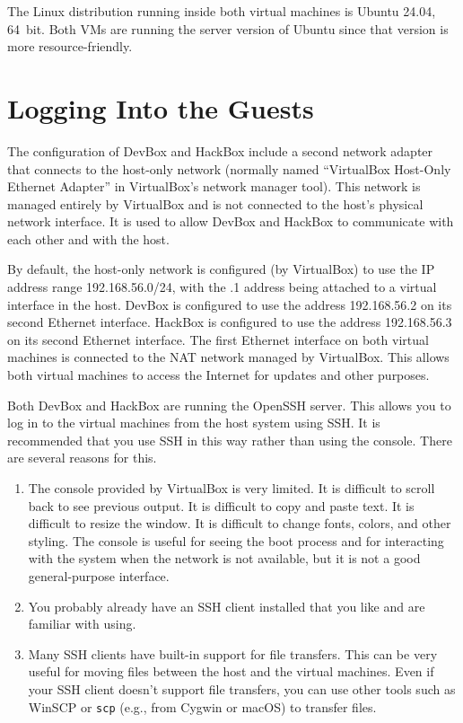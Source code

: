 \documentclass{article}
\begin{document}
The Linux distribution running inside both virtual machines is Ubuntu 24.04, 64~bit. Both VMs
are running the server version of Ubuntu since that version is more resource-friendly.

\section{Logging Into the Guests}
\label{sec:logging-in}

The configuration of DevBox and HackBox include a second network adapter that connects to the
host-only network (normally named ``VirtualBox Host-Only Ethernet Adapter'' in VirtualBox's
network manager tool). This network is managed entirely by VirtualBox and is not connected to
the host's physical network interface. It is used to allow DevBox and HackBox to communicate
with each other and with the host.

By default, the host-only network is configured (by VirtualBox) to use the IP address range
192.168.56.0/24, with the .1 address being attached to a virtual interface in the host. DevBox
is configured to use the address 192.168.56.2 on its second Ethernet interface. HackBox is
configured to use the address 192.168.56.3 on its second Ethernet interface. The first Ethernet
interface on both virtual machines is connected to the NAT network managed by VirtualBox. This
allows both virtual machines to access the Internet for updates and other purposes.

Both DevBox and HackBox are running the OpenSSH server. This allows you to log in to the virtual
machines from the host system using SSH. It is recommended that you use SSH in this way rather
than using the console. There are several reasons for this.

\begin{enumerate}
  \item The console provided by VirtualBox is very limited. It is difficult to scroll back to
    see previous output. It is difficult to copy and paste text. It is difficult to resize the
    window. It is difficult to change fonts, colors, and other styling. The console is useful
    for seeing the boot process and for interacting with the system when the network is not
    available, but it is not a good general-purpose interface.

  \item You probably already have an SSH client installed that you like and are familiar with
    using.
    
  \item Many SSH clients have built-in support for file transfers. This can be very useful for
    moving files between the host and the virtual machines. Even if your SSH client doesn't
    support file transfers, you can use other tools such as WinSCP or \texttt{scp} (e.g., from
    Cygwin or macOS) to transfer files.
\end{enumerate}
\end{document}
